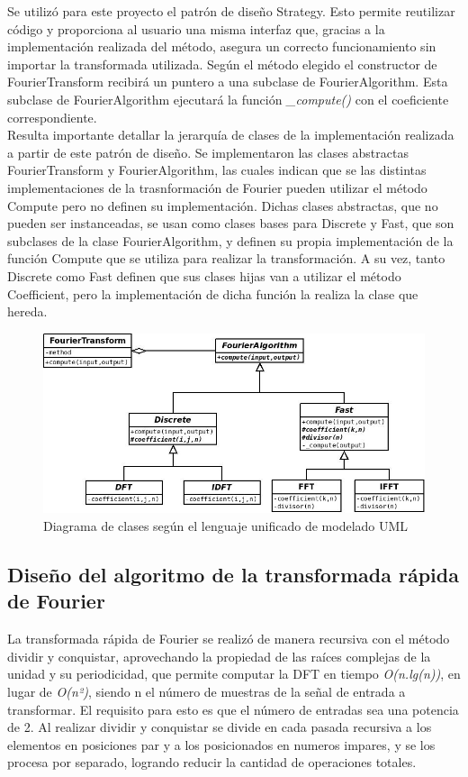 \documentclass[12pt,a4paper]{report}
\begin{document}
			\indent Se utilizó para este proyecto el patrón de diseño Strategy. Esto permite reutilizar código y proporciona
			al usuario una misma interfaz que, gracias a la implementación realizada del método, asegura un correcto funcionamiento
			sin importar la transformada utilizada. Según el método elegido el constructor de FourierTransform recibirá un puntero a 
			una subclase de FourierAlgorithm. Esta subclase de FourierAlgorithm ejecutará la función \textit{\_compute()} con el
			coeficiente correspondiente.
			\\
			\indent Resulta importante detallar la jerarquía de clases de la implementación realizada a partir de este patrón de diseño.
			Se implementaron las clases abstractas FourierTransform y FourierAlgorithm, las cuales indican que se las distintas
			implementaciones de la trasnformación de Fourier pueden utilizar el método Compute pero no definen su implementación. 
			Dichas clases abstractas, que no pueden ser instanceadas, se usan como clases bases para Discrete y Fast, que son subclases 
			de la clase FourierAlgorithm, y definen su propia implementación de la función Compute que se utiliza para realizar 
			la transformación. A su vez, tanto Discrete como Fast definen que sus clases hijas van a utilizar el método Coefficient, pero
			la implementación de dicha función la realiza la clase que hereda. 


			\begin{figure}[H]
				\centering
					\includegraphics[scale=0.55]{diagrama_de_clases.jpg}
				\caption{Diagrama de clases según el lenguaje unificado de modelado UML}
			\end{figure}
			
		\subsection{Diseño del algoritmo de la transformada rápida de Fourier}
			\indent La transformada rápida de Fourier se realizó de manera recursiva con el método dividir y conquistar, aprovechando 
			la propiedad de las raíces complejas de la unidad y su periodicidad, que permite computar la DFT en tiempo \textit{O(n.lg(n))},
			en lugar de \textit{O(n²)}, siendo n el número de muestras de la señal de entrada a transformar. El requisito para esto es
			que el número de entradas sea una potencia de 2. Al realizar dividir y conquistar se divide en cada pasada recursiva a los 
			elementos en posiciones par y a los posicionados en numeros impares, y se los procesa por separado, logrando reducir
			la cantidad de operaciones totales.   
\end{document}

